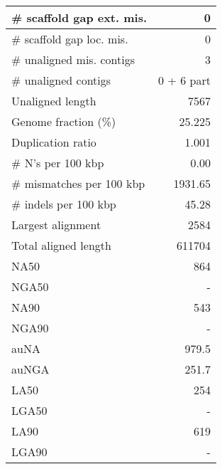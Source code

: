 \documentclass[12pt,a4paper]{article}
\begin{document}
\begin{table}[ht]
\begin{center}
\begin{tabular}{|l*{1}{|r}|}
\# scaffold gap ext. mis. & 0 \\ \hline
\# scaffold gap loc. mis. & 0 \\ \hline
\# unaligned mis. contigs & 3 \\ \hline
\# unaligned contigs & 0 + 6 part \\ \hline
Unaligned length & 7567 \\ \hline
Genome fraction (\%) & 25.225 \\ \hline
Duplication ratio & 1.001 \\ \hline
\# N's per 100 kbp & 0.00 \\ \hline
\# mismatches per 100 kbp & 1931.65 \\ \hline
\# indels per 100 kbp & 45.28 \\ \hline
Largest alignment & 2584 \\ \hline
Total aligned length & 611704 \\ \hline
NA50 & 864 \\ \hline
NGA50 & - \\ \hline
NA90 & 543 \\ \hline
NGA90 & - \\ \hline
auNA & 979.5 \\ \hline
auNGA & 251.7 \\ \hline
LA50 & 254 \\ \hline
LGA50 & - \\ \hline
LA90 & 619 \\ \hline
LGA90 & - \\ \hline
\end{tabular}
\end{center}
\end{table}
\end{document}
